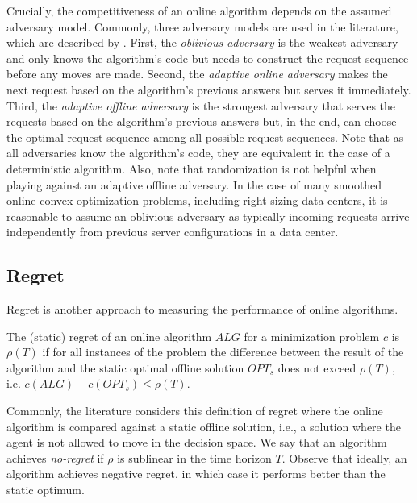 Crucially, the competitiveness of an online algorithm depends on the assumed adversary model. Commonly, three adversary models are used in the literature, which are described by \citeauthor*{Borodin1990} \cite{Borodin1990}. First, the \emph{oblivious adversary} is the weakest adversary and only knows the algorithm's code but needs to construct the request sequence before any moves are made. Second, the \emph{adaptive online adversary} makes the next request based on the algorithm's previous answers but serves it immediately. Third, the \emph{adaptive offline adversary} is the strongest adversary that serves the requests based on the algorithm's previous answers but, in the end, can choose the optimal request sequence among all possible request sequences. Note that as all adversaries know the algorithm's code, they are equivalent in the case of a deterministic algorithm. Also, note that randomization is not helpful when playing against an adaptive offline adversary. In the case of many smoothed online convex optimization problems, including right-sizing data centers, it is reasonable to assume an oblivious adversary as typically incoming requests arrive independently from previous server configurations in a data center.

\subsection{Regret}

Regret is another approach to measuring the performance of online algorithms.

\begin{definition}
The (static) regret of an online algorithm $ALG$ for a minimization problem $c$ is $\rho(T)$ if for all instances of the problem the difference between the result of the algorithm and the static optimal offline solution $OPT_s$ does not exceed $\rho(T)$, i.e. $c(ALG) - c(OPT_s) \leq \rho(T)$.
\end{definition}

Commonly, the literature considers this definition of regret where the online algorithm is compared against a static offline solution, i.e., a solution where the agent is not allowed to move in the decision space. We say that an algorithm achieves \emph{no-regret} if $\rho$ is sublinear in the time horizon $T$. Observe that ideally, an algorithm achieves negative regret, in which case it performs better than the static optimum.

